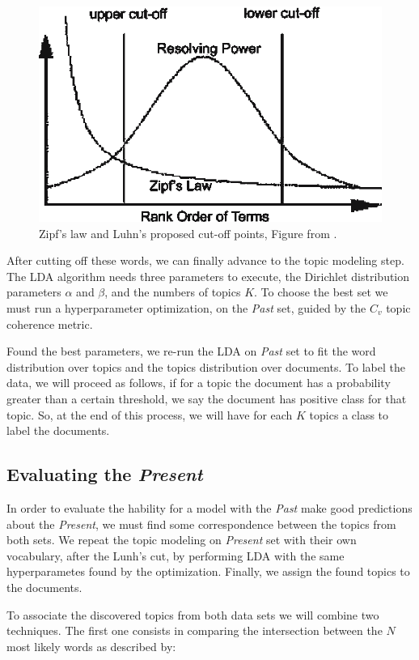 \begin{figure}[h!]
	\centering
	\includegraphics[width=0.55\linewidth]{01.Chapters/04.Materials/Zipfs-law-and-Luhns-proposed-cut-off-points}
	\caption{Zipf’s law and Luhn’s proposed cut-off points, Figure from \cite{cummins2006evolving}.}
	\label{fig:zipfs-law-and-luhns-proposed-cut-off-points}
\end{figure}

After cutting off these words, we can finally advance to the topic modeling step. The LDA algorithm needs three parameters to execute, the Dirichlet distribution parameters $\alpha$ and $\beta$, and the numbers of topics $K$. To choose the best set we must run a hyperparameter optimization, on the \textit{Past} set, guided by the $C_{v}$ topic coherence metric.

Found the best parameters, we re-run the LDA on \textit{Past} set to fit the word distribution over topics and the topics distribution over documents. To label the data, we will proceed as follows, if for a topic the document has a probability greater than a certain threshold, we say the document has positive class for that topic. So, at the end of this process, we will have for each $K$ topics a class to label the documents.

\subsection{Evaluating the \textit{Present}}\label{sec:material-combination}

In order to evaluate the hability for a model with the \textit{Past} make good predictions about the \textit{Present}, we must find some correspondence between the topics from both sets. We repeat the topic modeling on \textit{Present} set with their own vocabulary, after the Lunh's cut, by performing LDA with the same hyperparametes found by the optimization. Finally, we assign the found topics to the documents.

To associate the discovered topics from both data sets we will combine two techniques. The first one consists in comparing the intersection between the $N$ most likely words as described by:

